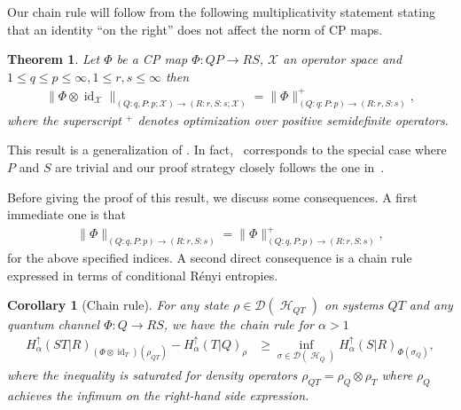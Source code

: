 \documentclass[11pt]{article}
\DeclareMathOperator{\id}{id}
\newcommand{\1}{\ensuremath{\mathbbm{1}}}
\theoremstyle{newdefinition}
\theoremstyle{newplain}
\newtheorem{theorem}[definition]{Theorem}
\newtheorem{corollary}[definition]{Corollary}
\theoremstyle{myplain}
\DeclareMathOperator{\cH}{\mathcal{H}}
\begin{document}
Our chain rule will follow from the following multiplicativity statement stating that an identity ``on the right'' does not affect the norm of CP maps.
\begin{theorem} \label{lem:reductionLemma}
  Let $\Phi$ be a CP map $\Phi:QP\to RS$, $\mathcal{X}$ an operator space and $1\leq q\leq p\leq \infty,1\leq r,s\leq \infty$ then
    \begin{align}        \|\Phi\otimes\id_{\mathcal{X}}\|_{(Q:q,P:p;\mathcal{X})\to(R:r,S:s;\mathcal{X})} = \|\Phi\|^+_{(Q:q:P:p)\to (R:r,S:s)},
    \end{align} where the superscript $^+$ denotes optimization over positive semidefinite operators. 
\end{theorem}

This result is a generalization of \cite[Lemma 5]{Devetak.2006}. In fact,~\cite[Lemma 5]{Devetak.2006} corresponds to the special case where $P$ and $S$ are trivial and our proof strategy closely follows the one in~\cite{Devetak.2006}.  

Before giving the proof of this result, we discuss some consequences.
A first immediate one is that
\begin{align}
    \|\Phi\|_{(Q:q,P:p)\to(R:r,S:s)} =     \|\Phi\|^+_{(Q:q,P:p)\to(R:r,S:s)}, %
\end{align}
for the above specified indices.
A second direct consequence is a chain rule expressed in terms of conditional R\'enyi entropies.

\begin{corollary}[Chain rule]\label{cor:Chain.Rules}
For any state $\rho \in \mathcal{D}(\cH_{QT})$ on systems $QT$ and any quantum channel $\Phi:Q\to RS$, we have the chain rule for $\alpha > 1$
\begin{align}
\label{eq:chain-rule-Q}
H^{\uparrow}_\alpha(ST|R)_{(\Phi 
\otimes \id_T)(\rho_{QT})} - H^{\uparrow}_\alpha(T|Q)_\rho &\geq   \inf_{\sigma \in \mathcal{D}(\cH_{Q})} H^{\uparrow}_\alpha(S|R)_{\Phi(\sigma_{Q})},
\end{align} where the inequality is saturated for density operators $\rho_{QT}=\rho_{Q}\otimes \rho_T$ where $\rho_Q$ achieves the infimum on the right-hand side expression. 
\end{corollary}
\end{document}

